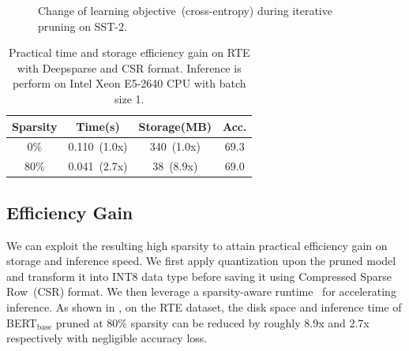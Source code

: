\begin{figure}[t]
	\centering
	\caption{Change of learning objective~(cross-entropy) during iterative pruning on SST-2.}
	\label{fig:lo}
\end{figure}

\begin{table}[t]
	\centering
	\small
	\begin{tabular}{c|cc|c}
		\toprule
		Sparsity & Time(s) & Storage(MB) & Acc. \\
		\midrule
		0\%      & 0.110~(1.0x)          & 340~(1.0x)  &  69.3\\
		80\%     & 0.041~(2.7x)          & 38~(8.9x) & 69.0 \\
		\bottomrule
	\end{tabular}
\caption{Practical time and storage efficiency gain on RTE with Deepsparse and CSR format. Inference is perform on Intel Xeon E5-2640 CPU with batch size 1.}
\label{table:eg}
\end{table}
\subsection{Efficiency Gain}
We can exploit the resulting high sparsity to attain practical efficiency gain on storage and inference speed. We first apply quantization  upon the pruned model and transform it into INT8 data type before saving it using Compressed Sparse Row~(CSR) format. We then leverage a sparsity-aware runtime~\cite{deepsparse} for accelerating inference. As shown in , on the RTE dataset, the disk space and inference time of BERT$_{\text{base}}$ pruned at 80\% sparsity can be reduced by roughly 8.9x and 2.7x respectively with negligible accuracy loss.
